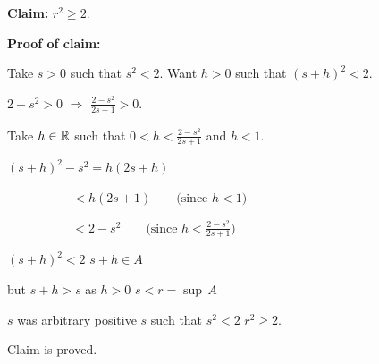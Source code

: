 \documentclass[10pt,aspectratio=149]{beamer}
\begin{document}
\begin{frame}
\textbf{Claim:} $r^2 \geq 2$.

\medskip
\pause

\textbf{Proof of claim:}

Take $s > 0$ such that $s^2 < 2$.
\quad
Want $h > 0$ such that ${(s+h)}^2 < 2$.

\medskip
\pause

$2-s^2 > 0$ \quad $\Rightarrow$ \quad $\frac{2-s^2}{2s+1} > 0$.

\medskip
\pause

Take $h \in {\mathbb{R}}$ such that $0 < h < \frac{2-s^2}{2s+1}$ and $h < 1$.

\medskip
\pause

$\displaystyle
{(s+h)}^2 - s^2 = h(2s + h)
$

\medskip
\pause

$\displaystyle
\, \quad \qquad \qquad < h(2s+1) \qquad  \bigl(\text{since } h < 1\bigr)
$

\medskip
\pause

$\displaystyle
\, \quad \qquad \qquad < 2-s^2 \qquad \bigl(\text{since } h < \tfrac{2-s^2}{2s+1} \bigr)
$

\medskip
\pause

\thus \quad ${(s+h)}^2 < 2$ \wthus $s+h \in A$

\medskip
\pause

but $s+h > s$ as $h > 0$ \wwthus $s < r = \sup\, A$

\medskip
\pause

$s$ was arbitrary positive $s$ such that $s^2 < 2$ \wwthus $r^2 \geq 2$.

\medskip
\pause

Claim is proved.
\end{frame}
\end{document}
